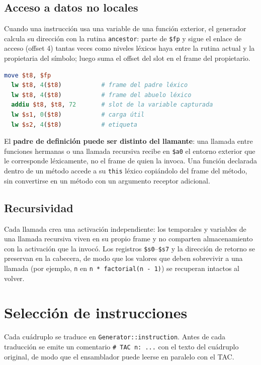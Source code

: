 \documentclass[11pt,a4paper]{article}
\begin{document}
\subsection{Acceso a datos no locales}

Cuando una instrucción usa una variable de una función exterior, el generador
calcula su dirección con la rutina \texttt{ancestor}: parte de \texttt{\$fp} y
sigue el enlace de acceso (offset 4) tantas veces como niveles léxicos haya
entre la rutina actual y la propietaria del símbolo; luego suma el offset del
slot en el frame del propietario.

\begin{lstlisting}[language=MIPS,style=sinnumero,caption={Acceso a una variable dos niveles léxicos afuera.}]
  move $t8, $fp
  lw $t8, 4($t8)           # frame del padre léxico
  lw $t8, 4($t8)           # frame del abuelo léxico
  addiu $t8, $t8, 72       # slot de la variable capturada
  lw $s1, 0($t8)           # carga útil
  lw $s2, 4($t8)           # etiqueta
\end{lstlisting}

El \textbf{padre de definición puede ser distinto del llamante}: una llamada
entre funciones hermanas o una llamada recursiva recibe en \texttt{\$a0} el
entorno exterior que le corresponde léxicamente, no el frame de quien la
invoca. Una función declarada dentro de un método accede a su \texttt{this}
léxico copiándolo del frame del método, sin convertirse en un método con un
argumento receptor adicional.

\subsection{Recursividad}

Cada llamada crea una activación independiente: los temporales y variables de
una llamada recursiva viven en su propio frame y no comparten almacenamiento con
la activación que la invocó. Los registros \texttt{\$s0}--\texttt{\$s7} y la
dirección de retorno se preservan en la cabecera, de modo que los valores que
deben sobrevivir a una llamada (por ejemplo, \texttt{n} en
\texttt{n * factorial(n - 1)}) se recuperan intactos al volver.

\section{Selección de instrucciones}

Cada cuádruplo se traduce en \texttt{Generator::instruction}. Antes de cada
traducción se emite un comentario \texttt{\# TAC n: ...} con el texto del
cuádruplo original, de modo que el ensamblador puede leerse en paralelo con el
TAC.
\end{document}
